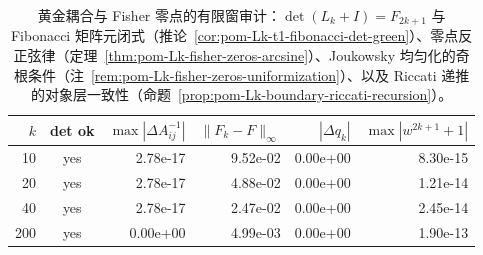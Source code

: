 \begin{table}[H]
\centering
\scriptsize
\setlength{\tabcolsep}{6pt}
\caption{黄金耦合与 Fisher 零点的有限窗审计：$\det(L_k+I)=F_{2k+1}$ 与 Fibonacci 矩阵元闭式（推论~\ref{cor:pom-Lk-t1-fibonacci-det-green}）、零点反正弦律（定理~\ref{thm:pom-Lk-fisher-zeros-arcsine}）、Joukowsky 均匀化的奇根条件（注~\ref{rem:pom-Lk-fisher-zeros-uniformization}）、以及 Riccati 递推的对象层一致性（命题~\ref{prop:pom-Lk-boundary-riccati-recursion}）。}
\label{tab:fence_green_kernel_golden_coupling_audit}
\begin{tabular}{r c r r r r}
\toprule
$k$ & det ok & $\max|\Delta A^{-1}_{ij}|$ & $\|F_k-F\|_\infty$ & $|\Delta q_k|$ & $\max|w^{2k+1}+1|$\\
\midrule
10 & yes & 2.78e-17 & 9.52e-02 & 0.00e+00 & 8.30e-15\\
20 & yes & 2.78e-17 & 4.88e-02 & 0.00e+00 & 1.21e-14\\
40 & yes & 2.78e-17 & 2.47e-02 & 0.00e+00 & 2.45e-14\\
200 & yes & 0.00e+00 & 4.99e-03 & 0.00e+00 & 1.90e-13\\
\bottomrule
\end{tabular}
\end{table}
